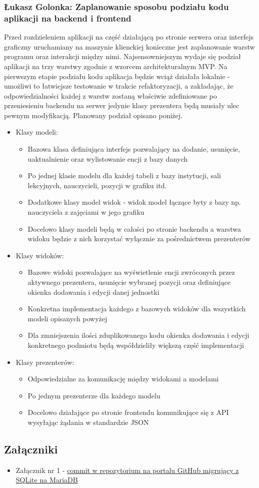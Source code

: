 \documentclass[12pt,a4paper,oneside]{article}
\theoremstyle{definition}
\numberwithin{equation}{section}
\begin{document}
\subsubsection{Łukasz Golonka: Zaplanowanie sposobu podziału kodu aplikacji na backend i frontend}
Przed rozdzieleniem aplikacji na część działającą po stronie serwera oraz interfejs graficzny uruchamiany na maszynie klienckiej konieczne jest zaplanowanie warstw programu oraz interakcji między nimi.
Najsensowniejszym wydaje się podział aplikacji na trzy warstwy zgodnie z wzorcem architekturalnym MVP.
Na pierwszym etapie podziału kodu aplikacja będzie wciąż działała lokalnie - 
umożliwi to łatwiejsze testowanie w trakcie refaktoryzacji, a zakładając, że odpowiedzialności każdej z warstw zostaną właściwie zdefiniowane po przeniesieniu backendu na serwer jedynie klasy prezentera będą musiały ulec pewnym modyfikacją.
Planowany podział opisano poniżej.
\begin{itemize}
	\item Klasy modeli:
	\begin{itemize}
		\item Bazowa klasa definiująca interfejs pozwalający na dodanie, usunięcie, uaktualnienie oraz wylistowanie encji z bazy danych
		\item Po jednej klasie modelu dla każdej tabeli z bazy instytucji, sali lekcyjnych, nauczycieli, pozycji w grafiku itd.
		\item Dodatkowe klasy model widok - widok model łączące byty z bazy np. nauczyciela z zajęciami w jego grafiku
		\item Docelowo klasy modeli będą w całości po stronie backendu a warstwa widoku będzie z nich korzystać wyłącznie za pośrednictwem prezenterów
	\end{itemize}
	\item Klasy widoków:
	\begin{itemize}
		\item Bazowe widoki pozwalające na wyświetlenie encji zwróconych przez aktywnego prezentera, usunięcie wybranej pozycji oraz definiujące okienka dodawania i edycji danej jednostki
		\item Konkretna implementacja każdego z bazowych widoków dla wszystkich modeli opisanych powyżej
		\item Dla zmniejszenia ilości zduplikowanego kodu okienka dodawania i edycji konkretnego podmiotu będą współdzieliły większą część implementacji
	\end{itemize}
	\item Klasy prezenterów:
	\begin{itemize}
		\item Odpowiedzialne za komunikację między widokami a modelami
		\item Po jednym prezenterze dla każdego modelu
		\item Docelowo działające po stronie frontendu komunikujące się z API wysyłając żądania w standardzie JSON
	\end{itemize}
\end{itemize}

\subsection{Załączniki}
\begin{itemize}
	\item Załącznik nr 1 - \href{https://github.com/lukaszgo1/engineering_project_2022/commit/1c006ace634aace0d886c0b150959a0dc259a92a}{commit w repozytorium na portalu GitHub migrujący z SQLite na MariaDB}
\end{itemize}
\end{document}

